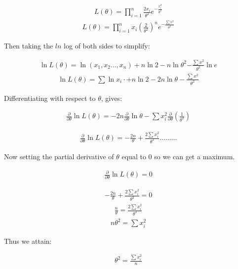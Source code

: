 \documentclass{article}
\begin{document}
\begin{align}
    L(\theta) = \prod_{i=1}^n\frac{2x_{i}}{\theta^2}e^{-\frac{x_{i}^2}{\theta^2}}
\end{align}
\begin{align}
    L(\theta) = \prod_{i=1}^n x_{i}(\frac{2}{\theta^2})^n e^{-\frac{\sum{x^2}}{\theta^2}}
\end{align}

Then taking the $ln$ log of both sides to simplify:

\begin{align}
    \ln{L(\theta)}= \ln{(x_{1},x_{2}\dots,x_{n})} + n\ln{2} - n\ln\theta^2 {-\frac{\sum{x^2}}{\theta^2}}\ln{e}
\end{align}
\begin{align}
    \ln{L(\theta)}= \sum\ln{x_{i}} \cdot + n\ln{2} - 2n\ln{\theta} -\frac{\sum{x^2}}{\theta^2}
\end{align}

Differentiating with respect to $\theta$, gives:

\begin{align}
    \frac{\partial }{\partial \theta}\ln L{(\theta)} = -2n\frac{\partial}{\partial\theta}\ln\theta - \sum x_{i}^2\frac{\partial}{\partial\theta}(\frac{1}{\theta^2})
\end{align}

\begin{align}
    \frac{\partial }{\partial \theta}\ln L{(\theta)} = -\frac{2n}{\theta} + \frac{2\sum x_{i}^2}{\theta^3} \dots \dots \dots
\end{align}

Now setting the partial  derivative of $\theta$ equal to $0$ so we can get a maximum.

\begin{align}
    \frac{\partial }{\partial \theta}\ln L{(\theta)} = 0
\end{align}

\begin{align}
    -\frac{2n}{\theta} + \frac{2\sum x_{i}^2}{\theta^3} = 0
\end{align}
\begin{align}
    \frac{n}{\theta} = \frac{2\sum x_{i}^2}{\theta^3}
\end{align}
\begin{align}
   n\theta^2= \sum x_{i}^2
\end{align}

Thus we attain:

\begin{align}
    \theta^2 = \frac{\sum x_{i}^2}{n}
\end{align}
\end{document}
